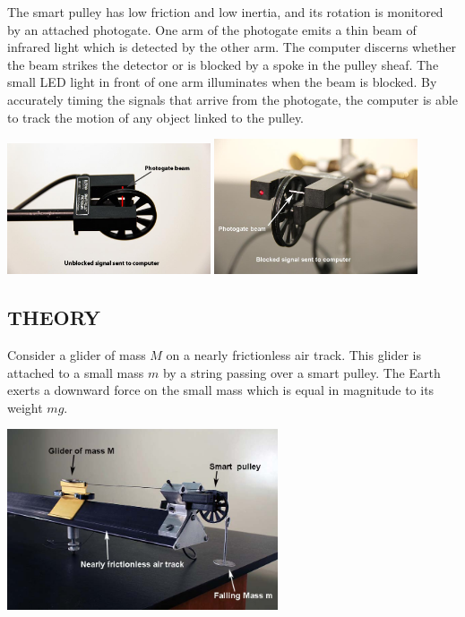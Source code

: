 The smart pulley has low friction and low inertia, and its rotation is monitored by an attached photogate.  One arm of the photogate emits a thin beam of infrared light which is detected by the other arm.  The computer discerns whether the beam strikes the detector or is blocked by a spoke in the pulley sheaf.  The small LED light in front of one arm illuminates when the beam is blocked.  By accurately timing the signals that arrive from the photogate, the computer is able to track the motion of any object linked to the pulley.
\begin{center} \includegraphics*[width=0.45\textwidth]{imgs/6labs/6Alab/6Aexp3/6A_exp3_beamthrough.jpg} \includegraphics*[width=0.45\textwidth]{imgs/6labs/6Alab/6Aexp3/6A_exp3_photogate_block_wht.jpg} \end{center}

\subsection*{THEORY}

Consider a glider of mass \(M\) on a nearly frictionless air track.  This glider is attached to a small mass \(m\) by a string passing over a smart pulley.  The Earth exerts a downward force on the small mass which is equal in magnitude to its weight \(mg\).
\begin{center} \includegraphics*[width=0.6\textwidth]{imgs/6labs/6Alab/6Aexp3/6B-EXP3_glidertrack.jpg} \end{center}

